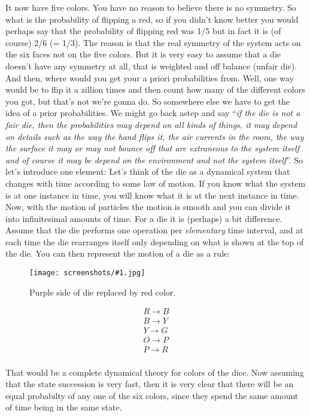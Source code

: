 \documentclass[a4, 12pt, english, USenglish]{scrreprt}
\newcommand{\screenshot}[2]{
\begin{figure}[htb]
\texttt{[image: screenshots/\#1.jpg]}
\label{#1}
\caption{#2}
\end{figure}}
\newcommand{\idx}[1]{{\em #1}\index{#1}}
\begin{document}
It now have five colors.  You have no reason to believe there is no
symmetry.  So what is the probability of flipping a red, so if you
didn't know better you would perhaps say that the probability of
flipping red was 1/5 but in fact it is (of course) 2/6 (= 1/3).  The
reason is that the real symmetry of the system acts on the six faces
not on the five colors.  But it is very easy to assume that a die
doesn't have any symmetry at all, that is weighted and off balance
(unfair die).  And then, where would you get your a priori
probabilities from.  Well, one way would be to flip it a zillion times
and then count how many of the different colors you got, but that's
not we're gonna do.  So somewhere else we have to get the idea of a
prior probabilities.  We might go back astep and say ``{\em if the die is
not a fair die, then the probabilities may depend on all kinds of
things, it may depend on details such as the way the hand flips it,
the air currents in the room, the way the surface it may or may not
bounce off that are extraneous to the system itself and of course it
may be depend on the environment and not the system itself}''.  So
let's introduce one element:  Let's think of the die as a dynamical
system that changes with time according to some law of motion.  If you
know what the system is at one instance in time, you will know what it
is at the next instance in time.  Now, with the motion of particles
the motion is smooth and you can divide it into infinitesimal amounts
of time. For a die it is (perhaps) a bit difference.  Assume that the
die performs one operation per \idx{elementary} time interval, and
at each time the die rearranges itself only depending on what is shown
at the top of the die.   You can then represent the motion of a  die
as a rule:

\screenshot{dynamictheory}{Purple side of die replaced by red color.}

\[
\begin{array}{lcl}
R \rightarrow B \\
B \rightarrow Y\\
Y \rightarrow G\\
O \rightarrow P\\
P \rightarrow R\\
\end{array}
\]

That would be a complete dynamical theory for colors of the dice.
Now assuming that the state succession is very fast, then it is very
clear that there will be an equal probabilty of any one of the six
colors, since they spend the same amount of time being in the same
state.
\end{document}
